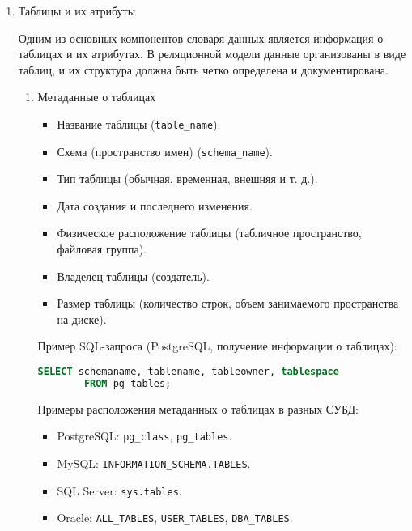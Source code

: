 \begin{enumerate}

    \item Таблицы и их атрибуты \autocites[§51.11]{PostgreSQLdocc51}[§28.3.38]{Mysqldoc1}{MicrosoftLearnSQLserver}

    Одним из основных компонентов словаря данных является информация о таблицах и их атрибутах. В реляционной модели данные организованы в виде таблиц, и их структура должна быть четко определена и документирована.

    \begin{enumerate}
        \item Метаданные о таблицах

        \begin{itemize}
            \item Название таблицы (\texttt{table\_name}).
            \item Схема (пространство имен) (\texttt{schema\_name}).
            \item Тип таблицы (обычная, временная, внешняя и т. д.).
            \item Дата создания и последнего изменения.
            \item Физическое расположение таблицы (табличное пространство, файловая группа).
            \item Владелец таблицы (создатель).
            \item Размер таблицы (количество строк, объем занимаемого пространства на диске).
        \end{itemize}

        Пример SQL-запроса (PostgreSQL, получение информации о таблицах):
        \begin{lstlisting}[language=SQL]
        SELECT schemaname, tablename, tableowner, tablespace 
        FROM pg_tables;
        \end{lstlisting}

        Примеры расположения метаданных о таблицах в разных СУБД:
        \begin{itemize}
            \item PostgreSQL: \texttt{pg\_class}, \texttt{pg\_tables}.
            \item MySQL: \texttt{INFORMATION\_SCHEMA.TABLES}.
            \item SQL Server: \texttt{sys.tables}.
            \item Oracle: \texttt{ALL\_TABLES}, \texttt{USER\_TABLES}, \texttt{DBA\_TABLES}.
        \end{itemize}


\end{enumerate}
\end{enumerate}
